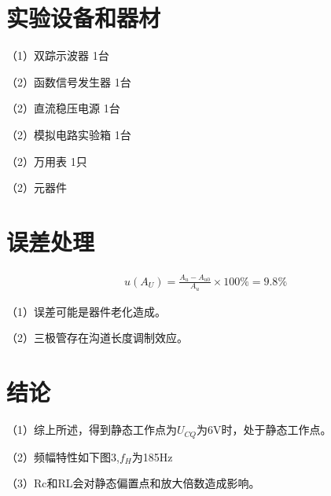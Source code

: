 \documentclass{article}
\begin{document}
	\section{ 实验设备和器材}
	（1）双踪示波器             \qquad \qquad    1台\par
	（2）函数信号发生器          \qquad         1台\par
	（2）直流稳压电源             \qquad \quad  1台\par
	（2）模拟电路实验箱            \qquad  1台\par
	（2）万用表                   \qquad  \qquad \qquad  1只\par
	（2）元器件   
\section{误差处理}

\begin{align*}
	\ u(A_U)=\frac{A_u-A_{u0}}{A_u} \times 100\%=9.8\%
	\end{align*}    \par
（1）误差可能是器件老化造成。\par
（2）三极管存在沟道长度调制效应。

\section{结论}
（1）综上所述，得到静态工作点为$U_{CQ}$为6V时，处于静态工作点。\par
（2）频幅特性如下图3,$f_H$为185Hz\par
（3）Rc和RL会对静态偏置点和放大倍数造成影响。
\end{document}

